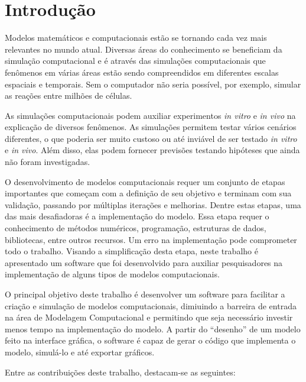 \documentclass[
	12pt,				%
	openright,			%
	oneside,			%
	a4paper,			%
	main=brazil,
	english,			%
	]{ufsj-abntex2}
\begin{document}
\chapter{Introdução}

Modelos matemáticos e computacionais estão se tornando cada vez mais relevantes no mundo atual. Diversas áreas do conhecimento se beneficiam da simulação computacional e é através das simulações computacionais que fenômenos em várias áreas estão sendo compreendidos em diferentes escalas espaciais e temporais. Sem o computador não seria possível, por exemplo, simular as reações entre milhões de células. 

As simulações computacionais podem auxiliar experimentos \textit{in vitro} e \textit{in vivo} na explicação de diversos fenômenos. As simulações permitem testar vários cenários diferentes, o que poderia ser muito custoso ou até inviável de ser testado \textit{in vitro} e \textit{in vivo}. Além disso, elas podem fornecer previsões testando hipóteses que ainda não foram investigadas. 

O desenvolvimento de modelos computacionais requer um conjunto de etapas importantes que começam com a definição de seu objetivo e terminam com sua validação, passando por múltiplas iterações e melhorias. Dentre estas etapas, uma das mais desafiadoras é a implementação do modelo. Essa etapa requer o conhecimento de métodos numéricos, programação, estruturas de dados, bibliotecas, entre outros recursos. Um erro na implementação pode comprometer todo o trabalho. Visando a simplificação desta etapa, neste trabalho é apresentado um software que foi desenvolvido para auxiliar pesquisadores na implementação de alguns tipos de modelos computacionais. 

O principal objetivo deste trabalho é desenvolver um software para facilitar a criação e simulação de modelos computacionais, dimiuindo a barreira de entrada na área de Modelagem Computacional e permitindo que seja necessário investir menos tempo na implementação do modelo. A partir do ``desenho'' de um modelo feito na interface gráfica, o software é capaz de gerar o código que implementa o modelo, simulá-lo e até exportar gráficos.


Entre as contribuições deste trabalho, destacam-se as seguintes: 
\end{document}
